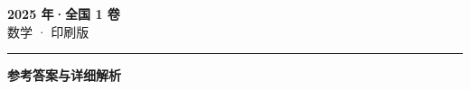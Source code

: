 \documentclass[zihao=5, a4paper]{ctexart}
\begin{document}
\begin{center}
  {\Large\bfseries 2025 年·全国 1 卷}\\[4pt]
  {\large 数学 · 印刷版}
\end{center}
\medskip
{}

\par\bigskip\hrule\bigskip
{}
\begin{center}{\large\bfseries 参考答案与详细解析}\end{center}
\smallskip

\end{document}
